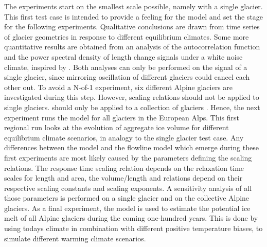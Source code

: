     The experiments start on the smallest scale possible, namely with a single glacier. This first test case is intended to provide a feeling for the model and set the stage for the following experiments. Qualitative conclusions are drawn from time series of glacier geometries in response to different equilibrium climates. Some more quantitative results are obtained from an analysis of the autocorrelation function and the power spectral density of length change signals under a white noise climate, inspired by \citep{Roe2014}. Both analyses can only be performed on the signal of a single glacier, since mirroring oscillation of different glaciers could cancel each other out. To avoid a N-of-1 experiment, six different Alpine glaciers are investigated during this step. 
    However, scaling relations should not be applied to single glaciers. \Vas{} should only be applied to a collection of glaciers \citep{Bahr2015}. Hence, the next experiment runs the model for all glaciers in the European Alps. This first regional run looks at the evolution of aggregate ice volume for different equilibrium climate scenarios, in analogy to the single glacier test case.
    Any differences between the \vas{} model and the flowline model which emerge during these first experiments are most likely caused by the parameters defining the scaling relations. The response time scaling relation depends on the relaxation time scales for length and area, the volume/length and \vas{} relations depend on their respective scaling constants and scaling exponents. A sensitivity analysis of all those parameters is performed on a single glacier and on the collective Alpine glaciers.
    As a final experiment, the \vas{} model is used to estimate the potential ice melt of all Alpine glaciers during the coming one-hundred years. This is done by using todays climate in combination with different positive temperature biases, to simulate different warming climate scenarios.

